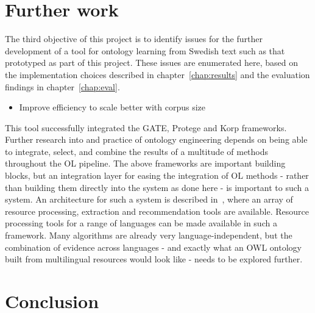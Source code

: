 \documentclass[a4paper]{report}
\begin{document}
\chapter{Further work}
\label{chap:further}

The third objective of this project is to identify issues for the further development of a tool for ontology learning from Swedish text such as that prototyped as part of this project.
These issues are enumerated here, based on the implementation choices described in chapter~\ref{chap:results} and the evaluation findings in chapter~\ref{chap:eval}.

\begin{itemize}
\item Improve efficiency to scale better with corpus size
\end{itemize}

This tool successfully integrated the GATE, Protege and Korp frameworks.
Further research into and practice of ontology engineering depends on being able to integrate, select, and combine the results of a multitude of methods throughout the OL pipeline.
The above frameworks are important building blocks, but an integration layer for easing the integration of OL methods - rather than building them directly into the system as done here - is important to such a system.
An architecture for such a system is described in~\citep{Cimiano2009OL}, where an array of resource processing, extraction and recommendation tools are available.
Resource processing tools for a range of languages can be made available in such a framework.
Many algorithms are already very language-independent, but the combination of evidence across languages - and exactly what an OWL ontology built from multilingual resources would look like - needs to be explored further.

\chapter{Conclusion}
\end{document}
